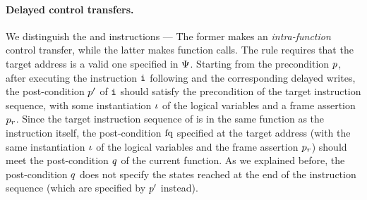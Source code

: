 %			
%			
%			
%			
%

\paragraph{\textbf{Delayed control transfers.}}
We distinguish the \jmp{} and \call{} instructions ---
The former makes an {\em intra-function} control transfer, while the
latter makes function calls.
The  rule requires that the target
address is a valid one specified in $\Psi$.
Starting from the precondition $p$, after
executing the instruction $\texttt{i}$ following
 and the corresponding delayed writes,
the post-condition $p'$ of $\texttt{i}$ should
satisfy the precondition of the target instruction
sequence, with some instantiation $\iota$ of the
logical variables and a frame assertion $p_r$.
Since the target instruction sequence of \jmp{}
is in the same function as the \jmp{} instruction itself,
the post-condition $\text{fq}$ specified at the target address
(with the same instantiation $\iota$ of the
logical variables and the frame assertion $p_r$)
should meet the post-condition $q$ of the current
function. As we explained before, the post-condition
$q$ does not specify the states reached at
the end of the instruction sequence (which are specified
by $p'$ instead).

